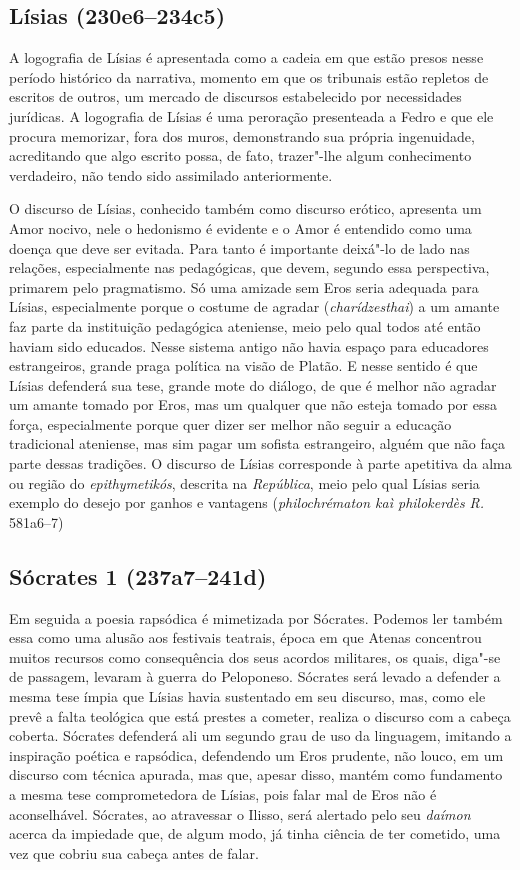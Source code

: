 \subsection{\textbf{Lísias} (230e6--234c5)} 


A logografia de Lísias é apresentada
como a cadeia em que estão presos nesse período histórico da narrativa,
momento em que os tribunais estão repletos de escritos de outros, um
mercado de discursos estabelecido por necessidades jurídicas. A logografia de Lísias é uma peroração presenteada a Fedro e que ele
procura memorizar, fora dos muros, demonstrando sua própria ingenuidade,
acreditando que algo escrito possa, de fato, trazer"-lhe algum
conhecimento verdadeiro, não tendo sido assimilado anteriormente.


O discurso de Lísias, conhecido também como discurso erótico, apresenta
um Amor nocivo, nele o hedonismo é evidente e o Amor é entendido como
uma doença que deve ser evitada. Para tanto é importante deixá"-lo de
lado nas relações, especialmente nas pedagógicas, que devem, segundo
essa perspectiva, primarem pelo pragmatismo. Só uma amizade sem Eros
seria adequada para Lísias, especialmente porque o costume de agradar
(\emph{charídzesthai}) a um amante faz parte da instituição pedagógica
ateniense, meio pelo qual todos até então haviam sido educados. Nesse
sistema antigo não havia espaço para educadores estrangeiros, grande
praga política na visão de Platão. E nesse sentido é que Lísias
defenderá sua tese, grande mote do diálogo, de que é melhor não agradar
um amante tomado por Eros, mas um qualquer que não esteja tomado por
essa força, especialmente porque quer dizer ser melhor não seguir a
educação tradicional ateniense, mas sim pagar um sofista estrangeiro,
alguém que não faça parte dessas tradições. O discurso de Lísias
corresponde à parte apetitiva da alma ou região do \emph{epithymetikós},
descrita na \emph{República}, meio pelo qual Lísias seria exemplo do
desejo por ganhos e vantagens (\emph{philochrématon kaì
philokerdès} \emph{R.} 581a6--7)


\subsection{Sócrates 1 (237a7--241d)} 

Em seguida a poesia rapsódica é
mimetizada por Sócrates. Podemos ler também essa como uma alusão aos
festivais teatrais, época em que Atenas concentrou muitos recursos como
consequência dos seus acordos militares, os quais, diga"-se de passagem,
levaram à guerra do Peloponeso. Sócrates será levado a defender a mesma
tese ímpia que Lísias havia sustentado em seu discurso, mas, como ele
prevê a falta teológica que está prestes a cometer, realiza o discurso
com a cabeça coberta. Sócrates defenderá ali um segundo grau de uso da
linguagem, imitando a inspiração poética e rapsódica, defendendo um Eros
prudente, não louco, em um discurso com técnica apurada, mas que, apesar
disso, mantém como fundamento a mesma tese comprometedora de Lísias,
pois falar mal de Eros não é aconselhável. Sócrates, ao atravessar o
Ilisso, será alertado pelo seu \emph{daímon} acerca da impiedade que, de
algum modo, já tinha ciência de ter cometido, uma vez que cobriu sua
cabeça antes de falar.

